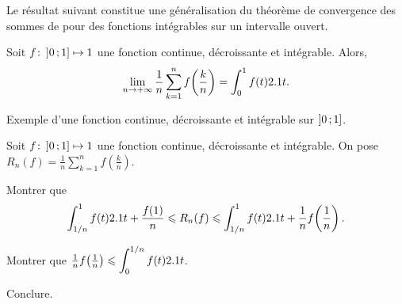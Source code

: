 


\medskip

Le résultat suivant constitue une généralisation du théorème de convergence des sommes de  pour des fonctions intégrables sur un intervalle ouvert.

\begin{prop}
    Soit $\fonctionligne[f]{\interof{0}{1}}{\R}$ une fonction continue, décroissante et intégrable. Alors,
    \[
    \lim\limits_{n \to +\infty} \frac{1}{n} \sum\limits_{k=1}^n f\mathopen{}\left(\frac{k}{n}\right) =\int_0^1 f(t) \d t.
    \]
\end{prop}

\begin{marginfigure}
    \centering
    
    \caption{Exemple d'une fonction continue, décroissante et intégrable sur $\interof{0}{1}$.}
\end{marginfigure}

\begin{exercice}
Soit $\fonctionligne[f]{\interof{0}{1}}{\R}$ une fonction continue, décroissante et intégrable. On pose \mbox{$R_n(f) = \frac{1}{n} \sum\limits_{k=1}^n f\mathopen{}\left(\frac{k}{n}\right)$}.
\begin{questions}
\item Montrer que
\[
\displaystyle\int_{1/n}^1 f(t) \d t + \frac{f(1)}{n}
\leqslant R_n(f)
\leqslant \displaystyle\int_{1/n}^1 f(t) \d t + \frac{1}{n}  f\mathopen{}\left(\frac{1}{n}\right).
\]

\item Montrer que $\frac{1}{n} f\mathopen{}\left(\frac{1}{n}\right) \leqslant \displaystyle\int_0^{1/n} f(t) \d t$.

\item Conclure.
\end{questions}
\end{exercice}



